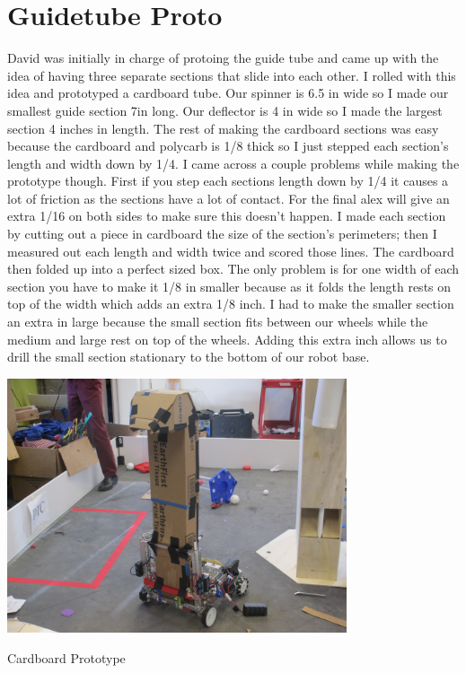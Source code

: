 \section*{Guidetube Proto}
David was initially in charge of protoing the guide tube and came up with the idea of having three separate sections that slide into each other. I rolled with this idea and prototyped a cardboard tube. Our spinner is 6.5 in wide so I made our smallest guide section 7in long. Our deflector is 4 in wide so I made the largest section 4 inches in length. The rest of making the cardboard sections was easy because the cardboard and polycarb is 1/8 thick so I just stepped each section’s length and width down by 1/4. I came across a couple problems while making the prototype though. First if you step each sections length down by 1/4 it causes a lot of friction as the sections have a lot of contact. For the final alex will give an extra 1/16 on both sides to make sure this doesn’t happen. I made each section by cutting out a piece in cardboard the size of the section’s perimeters; then I measured out each length and width twice and scored those lines. The cardboard then folded up into a perfect sized box. The only problem is for one width of each section you have to make it 1/8 in smaller because as it folds the length rests on top of the width which adds an extra 1/8 inch. I had to make the smaller section an extra in large because the small section fits between our wheels while the medium and large rest on top of the wheels. Adding this extra inch allows us to drill the small section stationary to the bottom of our robot base.

\begin{center}
\includegraphics[width=10cm]{./Entries/Images/CardboardProto.jpg}
\end{center}

Cardboard Prototype

